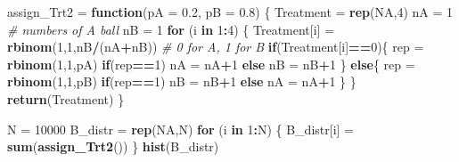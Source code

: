 \documentclass[]{article}
\newenvironment{Shaded}{\begin{snugshade}}{\end{snugshade}}
\newcommand{\CommentTok}[1]{\textcolor[rgb]{0.56,0.35,0.01}{\textit{#1}}}
\newcommand{\ControlFlowTok}[1]{\textcolor[rgb]{0.13,0.29,0.53}{\textbf{#1}}}
\newcommand{\DataTypeTok}[1]{\textcolor[rgb]{0.13,0.29,0.53}{#1}}
\newcommand{\DecValTok}[1]{\textcolor[rgb]{0.00,0.00,0.81}{#1}}
\newcommand{\FloatTok}[1]{\textcolor[rgb]{0.00,0.00,0.81}{#1}}
\newcommand{\KeywordTok}[1]{\textcolor[rgb]{0.13,0.29,0.53}{\textbf{#1}}}
\newcommand{\NormalTok}[1]{#1}
\newcommand{\OperatorTok}[1]{\textcolor[rgb]{0.81,0.36,0.00}{\textbf{#1}}}
\newcommand{\OtherTok}[1]{\textcolor[rgb]{0.56,0.35,0.01}{#1}}
\newcommand{\StringTok}[1]{\textcolor[rgb]{0.31,0.60,0.02}{#1}}
\begin{document}
\begin{Shaded}
\begin{Highlighting}[]
\NormalTok{assign_Trt2 =}\StringTok{ }\ControlFlowTok{function}\NormalTok{(}\DataTypeTok{pA =} \FloatTok{0.2}\NormalTok{, }\DataTypeTok{pB =} \FloatTok{0.8}\NormalTok{) \{}
\NormalTok{  Treatment =}\StringTok{ }\KeywordTok{rep}\NormalTok{(}\OtherTok{NA}\NormalTok{,}\DecValTok{4}\NormalTok{)}
\NormalTok{  nA =}\StringTok{ }\DecValTok{1} \CommentTok{# numbers of A ball}
\NormalTok{  nB =}\StringTok{ }\DecValTok{1} 
  \ControlFlowTok{for}\NormalTok{ (i }\ControlFlowTok{in} \DecValTok{1}\OperatorTok{:}\DecValTok{4}\NormalTok{) \{}
\NormalTok{    Treatment[i] =}\StringTok{ }\KeywordTok{rbinom}\NormalTok{(}\DecValTok{1}\NormalTok{,}\DecValTok{1}\NormalTok{,nB}\OperatorTok{/}\NormalTok{(nA}\OperatorTok{+}\NormalTok{nB)) }\CommentTok{# 0 for A, 1 for B}
    \ControlFlowTok{if}\NormalTok{(Treatment[i]}\OperatorTok{==}\DecValTok{0}\NormalTok{)\{}
\NormalTok{      rep =}\StringTok{ }\KeywordTok{rbinom}\NormalTok{(}\DecValTok{1}\NormalTok{,}\DecValTok{1}\NormalTok{,pA)}
      \ControlFlowTok{if}\NormalTok{(rep}\OperatorTok{==}\DecValTok{1}\NormalTok{)}
\NormalTok{        nA =}\StringTok{ }\NormalTok{nA}\OperatorTok{+}\DecValTok{1}
      \ControlFlowTok{else}
\NormalTok{        nB =}\StringTok{ }\NormalTok{nB}\OperatorTok{+}\DecValTok{1}
\NormalTok{    \}}
    \ControlFlowTok{else}\NormalTok{\{}
\NormalTok{      rep =}\StringTok{ }\KeywordTok{rbinom}\NormalTok{(}\DecValTok{1}\NormalTok{,}\DecValTok{1}\NormalTok{,pB)}
      \ControlFlowTok{if}\NormalTok{(rep}\OperatorTok{==}\DecValTok{1}\NormalTok{)}
\NormalTok{        nB =}\StringTok{ }\NormalTok{nB}\OperatorTok{+}\DecValTok{1}
      \ControlFlowTok{else}
\NormalTok{        nA =}\StringTok{ }\NormalTok{nA}\OperatorTok{+}\DecValTok{1}
\NormalTok{    \}}
\NormalTok{  \}}
  \KeywordTok{return}\NormalTok{(Treatment)}
\NormalTok{\}}
\end{Highlighting}
\end{Shaded}

\begin{Shaded}
\begin{Highlighting}[]
\NormalTok{N =}\StringTok{ }\DecValTok{10000}
\NormalTok{B_distr =}\StringTok{ }\KeywordTok{rep}\NormalTok{(}\OtherTok{NA}\NormalTok{,N)}
\ControlFlowTok{for}\NormalTok{ (i }\ControlFlowTok{in} \DecValTok{1}\OperatorTok{:}\NormalTok{N) \{}
\NormalTok{  B_distr[i] =}\StringTok{ }\KeywordTok{sum}\NormalTok{(}\KeywordTok{assign_Trt2}\NormalTok{())}
\NormalTok{\}}
\KeywordTok{hist}\NormalTok{(B_distr)}
\end{Highlighting}
\end{Shaded}
\end{document}
